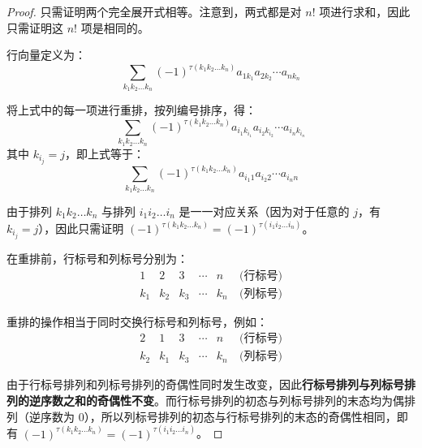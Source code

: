 \begin{proof}
	只需证明两个完全展开式相等。注意到，两式都是对 $n!$ 项进行求和，因此只需证明这 $n!$ 项是相同的。

	行向量定义为：
	$$
	\sum_{k_1 k_2 \ldots k_n} (-1)^{\tau(k_1 k_2 \ldots k_n)} a_{1k_1} a_{2k_2} \cdots a_{nk_n}
	$$

	将上式中的每一项进行重排，按列编号排序，得：
	$$
	\sum_{k_1 k_2 \ldots k_n} (-1)^{\tau(k_1 k_2 \ldots k_n)} a_{i_1 k_{i_1}} a_{i_2 k_{i_2}} \cdots a_{i_n k_{i_n}}
	$$
	其中 $k_{i_j} = j$，即上式等于：
	$$
	\sum_{k_1 k_2 \ldots k_n} (-1)^{\tau(k_1 k_2 \ldots k_n)} a_{i_1 1} a_{i_2 2} \cdots a_{i_n n}
	$$

	由于排列 $k_1 k_2 \ldots k_n$ 与排列 $i_1 i_2 \ldots i_n$ 是一一对应关系（因为对于任意的 $j$，有 $k_{i_j} = j$），因此只需证明 $(-1)^{\tau(k_1 k_2 \ldots k_n)} = (-1)^{\tau(i_1 i_2 \ldots i_n)}$。

	\bigskip

	在重排前，行标号和列标号分别为：
	$$
	\begin{matrix}
		1 & 2 & 3 & \cdots & n & \pod{\text{行标号}}
		\\
		k_1 & k_2 & k_3 & \cdots & k_n & \pod{\text{列标号}}
	\end{matrix}
	$$

	重排的操作相当于同时交换行标号和列标号，例如：
	$$
	\begin{matrix}
		2 & 1 & 3 & \cdots & n & \pod{\text{行标号}}
		\\
		k_2 & k_1 & k_3 & \cdots & k_n & \pod{\text{列标号}}
	\end{matrix}
	$$

	由于行标号排列和列标号排列的奇偶性同时发生改变，因此\textbf{行标号排列与列标号排列的逆序数之和的奇偶性不变}。而行标号排列的初态与列标号排列的末态均为偶排列（逆序数为 $0$），所以列标号排列的初态与行标号排列的末态的奇偶性相同，即有 $(-1)^{\tau(k_1 k_2 \ldots k_n)} = (-1)^{\tau(i_1 i_2 \ldots i_n)}$。
\end{proof}